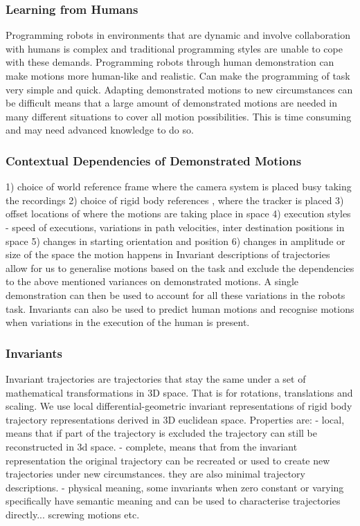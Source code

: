 \documentclass{article}
\begin{document}
\subsubsection{Learning from Humans}
Programming robots in environments that are dynamic and involve collaboration with humans is complex and traditional programming styles are unable to cope with these demands. 
Programming robots through human demonstration can make motions more human-like and realistic. 
Can make the programming of task very simple and quick. 
Adapting demonstrated motions to new circumstances can be difficult means that a large amount of demonstrated motions are needed in many different situations to cover all motion possibilities. 
This is time consuming and may need advanced knowledge to do so. 

\subsubsection{Contextual Dependencies of Demonstrated Motions}
1) choice of world reference frame where the camera system is placed busy taking the recordings
2) choice of rigid body references , where the tracker is placed 
3) offset locations of where the motions are taking place in space 
4) execution styles
    - speed of executions, variations in path velocities, inter destination positions in space
5) changes in starting orientation and position
6) changes in amplitude or size of the space the motion happens in 
Invariant descriptions of trajectories allow for us to generalise motions based on the task and exclude the dependencies to the above mentioned variances on demonstrated motions. 
A single demonstration can then be used to account for all these variations in the robots task.
Invariants can also be used to predict human motions and recognise motions when variations in the execution of the human is present. 

\subsubsection{Invariants}
Invariant trajectories are trajectories that stay the same under a set of mathematical transformations in 3D space.
That is for rotations, translations and scaling.
We use local differential-geometric invariant representations of rigid body trajectory representations derived in 3D euclidean space. 
Properties are: 
- local, means that if part of the trajectory is excluded the trajectory can still be reconstructed in 3d space. 
- complete, means that from the invariant representation the original trajectory can be recreated or used to create new trajectories under new circumstances. they are also minimal trajectory descriptions. 
- physical meaning, some invariants when zero constant or varying specifically have semantic meaning and can be used to characterise trajectories directly... screwing motions etc.
\end{document}
